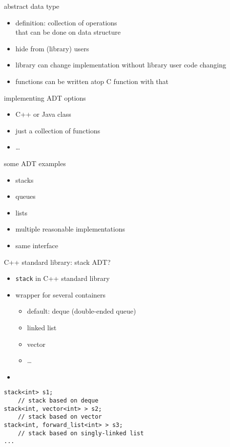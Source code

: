 \begin{frame}{abstract data type}
\begin{itemize}
\item definition: collection of operations \\
      that can be done on data structure
\vspace{.5cm}
\item<2-> hide  from (library) users
\item<2-> library can change implementation without library user code changing
\item<2-> functions can be written atop C function with that
\end{itemize}
\end{frame}


\begin{frame}{implementing ADT options}
    \begin{itemize}
    \item C++ or Java class
    \item just a collection of functions
    \item \ldots
    \end{itemize}
\end{frame}

\begin{frame}{some ADT examples}
    \begin{itemize}
        \item stacks
        \item queues
        \item lists
            \vspace{.5cm}
        \item multiple reasonable implementations
        \item same interface
    \end{itemize}
\end{frame}


\begin{frame}[fragile,label=stackAdt]{C++ standard library: stack ADT?}
\lstset{
    language=C++,
    style=small
}
\begin{itemize}
\item \texttt{stack} in C++ standard library
\item wrapper for several containers
    \begin{itemize}
    \item default: deque (double-ended queue)
    \item linked list
    \item vector
    \item \ldots
    \end{itemize}
\item {}
\end{itemize}
\begin{lstlisting}
stack<int> s1;
    // stack based on deque
stack<int, vector<int> > s2;
    // stack based on vector
stack<int, forward_list<int> > s3;
    // stack based on singly-linked list
...
\end{lstlisting}
\end{frame}

